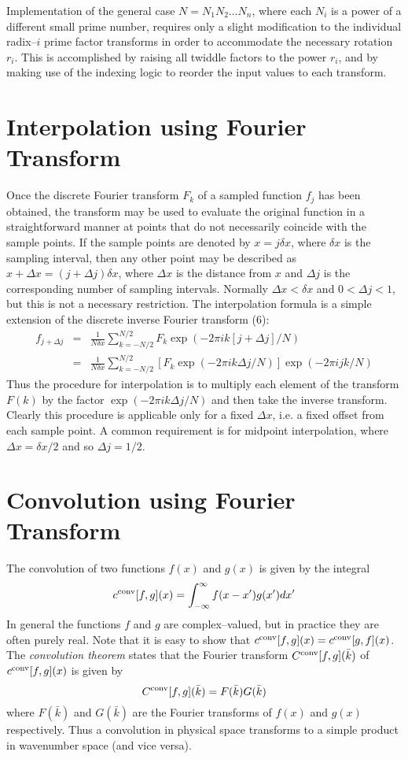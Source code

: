 \documentclass[dvips]{article}
\begin{document}
Implementation of the general case $N=N_{1}N_{2}\ldots N_{n}$, where
each $N_{i}$ is a power of a different small prime number, requires only
a slight
modification to the individual radix--$i$ prime factor transforms in
order to accommodate the necessary rotation $r_{i}$.  This is accomplished by
raising all twiddle factors to the power $r_{i}$, and by making use of
the indexing logic to reorder the input values to each transform. 

\section*{Interpolation using Fourier Transform}
Once the discrete Fourier transform $F_{k}$ of a sampled function $f_{j}$
has been obtained, the transform may be used to evaluate the original
function in a straightforward manner at points that do not necessarily coincide
with the sample points.  If the sample points are denoted by $x=j\delta x$,
where $\delta x$ is the sampling interval, then any other point may be
described as $x+\Delta x = (j+\Delta j)\delta x$, where $\Delta x$ is
the distance from $x$ and $\Delta j$ is the corresponding number of
sampling intervals.  Normally $\Delta x < \delta x$ and $0 < \Delta j <
1$, but this is not a necessary restriction.  The interpolation formula
is a simple extension of the discrete inverse Fourier transform (6):
\begin{eqnarray}
f_{j+\Delta j} & = & \frac{1}{N\delta x}\sum_{k=-N/2}^{N/2}
F_{k} \exp{(-2\pi ik[j+\Delta j]/N)} \nonumber \\
& = & \frac{1}{N\delta x}\sum_{k=-N/2}^{N/2}
\left[F_{k} \exp{(-2\pi ik\Delta j/N)}\right]\exp{(-2\pi ijk/N)} 
\end{eqnarray}
Thus the procedure for interpolation is to multiply each element of the
transform $F(k)$ by the factor $\exp{(-2\pi ik\Delta j/N)}$ and then
take the inverse transform.  Clearly this procedure is applicable only
for a fixed $\Delta x$, i.e. a fixed offset from each sample point.  A
common requirement is for midpoint interpolation, where $\Delta x =
\delta x/2$ and so $\Delta j = 1/2$.

\section*{Convolution using Fourier Transform}
The convolution of two functions $f(x)$ and $g(x)$ is given by the integral 
\begin{equation}
c^{\rm conv}[f,g](x) = \int_{-\infty}^{\infty} f(x-x')g(x')dx'
\end{equation}
In general the functions $f$ and $g$ are complex--valued, but in practice
they are often purely real.  Note that it is easy to show that
$c^{\rm conv}[f,g](x) = c^{\rm conv}[g,f](x)$.
The {\it convolution theorem} states that the Fourier transform
$C^{\rm conv}[f,g](\bar{k})$ of $c^{\rm conv}[f,g](x)$ is given by
\begin{equation}
C^{\rm conv}[f,g](\bar{k}) = F(\bar{k})G(\bar{k})
\end{equation}
where $F(\bar{k})$ and $G(\bar{k})$ are the Fourier transforms of $f(x)$
and $g(x)$ respectively.  Thus a convolution in physical space transforms to a
simple product in wavenumber space (and vice versa).
\end{document}
